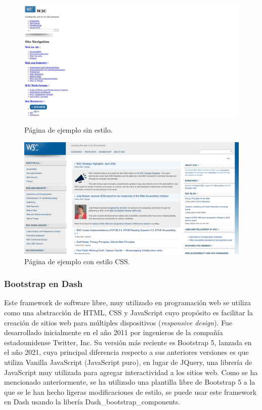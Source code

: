 \documentclass[a4paper, 12pt, oneside]{book}
\begin{document}
\begin{figure}[H]
  \centering
  \begin{minipage}[b]{0.4\textwidth}
    \includegraphics[width=\textwidth]{img/w3c_sin_css}
    \caption{Página de ejemplo sin estilo.}
    \label{figura:w3c_sin_css}
  \end{minipage}
  \hfill
  \begin{minipage}[b]{0.4\textwidth}
    \includegraphics[width=\textwidth]{img/w3c_con_css}
    \caption{Página de ejemplo con estilo CSS.}
    \label{figura:w3c_con_css}
  \end{minipage}
\end{figure}

\subsubsection{Bootstrap en Dash}
\label{subsubsec:boostrap}
Este framework de software libre, muy utilizado en programación web se utiliza como una abstracción de HTML, CSS y JavaScript cuyo propósito es facilitar la creación de sitios web para múltiples dispositivos (\textit{responsive design}). Fue desarrollado inicialmente en el año 2011 por ingenieros de la compañía estadounidense Twitter, Inc. Su versión más reciente es Bootstrap 5, lanzada en el año 2021, cuya principal diferencia respecto a sus anteriores versiones es que utiliza Vanilla JavaScript (JavaScript puro), en lugar de JQuery, una librería de JavaScript muy utilizada para agregar interactividad a los sitios web.
Como se ha mencionado anteriormente, se ha utilizado una plantilla libre de Bootstrap 5 a la que se le han hecho ligeras modificaciones de estilo, se puede usar este framework en Dash usando la libería Dash\_bootstrap\_components.
\end{document}
